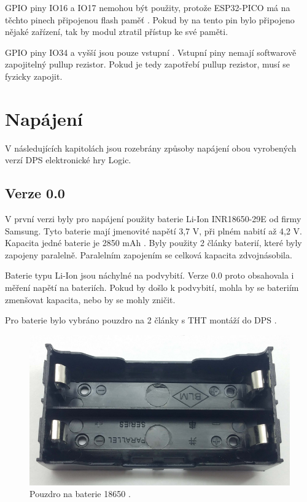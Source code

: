   GPIO piny IO16 a IO17 nemohou být použity, protože ESP32-PICO má na těchto pinech připojenou flash paměť \cite{PICO_datasheet}.
  Pokud by na tento pin bylo připojeno nějaké zařízení, tak by modul ztratil přístup ke své paměti.

  GPIO piny IO34 a vyšší jsou pouze vstupní \cite{PICO_datasheet}. Vstupní piny nemají softwarově zapojitelný pullup rezistor. 
  Pokud je tedy zapotřebí pullup rezistor, musí se fyzicky zapojit.
  
  \section{Napájení}
  V následujících kapitolách jsou rozebrány způsoby napájení obou vyrobených verzí DPS elektronické hry Logic.

  \subsection{Verze 0.0}
  V první verzi byly pro napájení použity baterie Li-Ion INR18650-29E od firmy Samsung. Tyto baterie mají jmenovité napětí 3,7 V, 
  při plném nabití až 4,2 V. Kapacita jedné baterie je 2850 mAh \cite{18650}. Byly použity 2 články baterií, které byly zapojeny paralelně. 
  Paralelním zapojením se celková kapacita zdvojnásobila.

  Baterie typu Li-Ion jsou náchylné na podvybití. Verze 0.0 proto obsahovala i měření napětí na bateriích. Pokud by došlo k podvybití, mohla 
  by se bateriím zmenšovat kapacita, nebo by se mohly zničit. 

  Pro baterie bylo vybráno pouzdro na 2 články s THT montáží do DPS \cite{18650_pouzdro}.

  \begin{figure}[!h]
    \begin{center}
      \includegraphics[scale=0.7]{obrazky/18650_pouzdro_na_baterie.png}
    \end{center}
    \caption[Pouzdro na baterie 18650]{Pouzdro na baterie 18650 \cite{18650_pouzdro}.}
  \end{figure}

